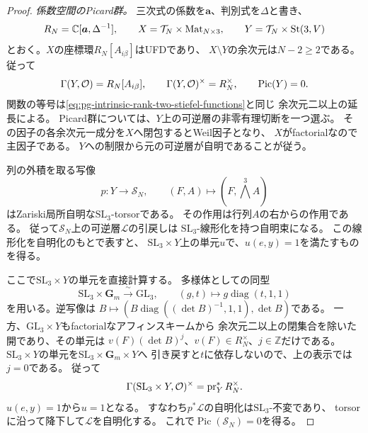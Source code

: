 \begin{proof}
\emph{係数空間のPicard群。}
三次式の係数を$\boldsymbol a$、判別式を$\Delta$と書き、
\begin{equation}
 R_N=\mathbb C[\boldsymbol a,\Delta^{-1}],\qquad
 X=\mathcal T_N\times\operatorname{Mat}_{N\times3},\qquad
 Y=\mathcal T_N\times\operatorname{St}(3,V)
 \label{eq:pg-intrinsic-gerbe-stiefel-cover}
\end{equation}
とおく。$X$の座標環$R_N[A_{i\beta}]$はUFDであり、
$X\setminus Y$の余次元は$N-2\ge2$である。
従って
\begin{equation}
 \Gamma(Y,\mathcal O)=R_N[A_{i\beta}],\qquad
 \Gamma(Y,\mathcal O)^\times=R_N^\times,\qquad
 \operatorname{Pic}(Y)=0.
 \label{eq:pg-intrinsic-gerbe-stiefel-picard}
\end{equation}
関数の等号は\eqref{eq:pg-intrinsic-rank-two-stiefel-functions}と同じ
余次元二以上の延長による。
Picard群については、$Y$上の可逆層の非零有理切断を一つ選ぶ。
その因子の各余次元一成分を$X$へ閉包するとWeil因子となり、
$X$がfactorialなので主因子である。
$Y$への制限から元の可逆層が自明であることが従う。

列の外積を取る写像
\begin{equation}
 p:Y\longrightarrow\mathcal S_N,\qquad
 (F,A)\longmapsto(F,\textstyle\bigwedge^3A)
 \label{eq:pg-intrinsic-gerbe-sl3-torsor}
\end{equation}
はZariski局所自明な$\mathrm{SL}_3$-torsorである。
その作用は行列$A$の右からの作用である。
従って$\mathcal S_N$上の可逆層$\mathcal L$の引戻しは
$\mathrm{SL}_3$-線形化を持つ自明束になる。
この線形化を自明化のもとで表すと、
$\mathrm{SL}_3\times Y$上の単元$u$で、$u(e,y)=1$を満たすものを得る。

ここで$\mathrm{SL}_3\times Y$の単元を直接計算する。
多様体としての同型
\begin{equation}
 \mathrm{SL}_3\times\mathbf G_m\xrightarrow{\ \sim\ }\mathrm{GL}_3,
 \qquad (g,t)\longmapsto g\operatorname{diag}(t,1,1)
 \label{eq:pg-intrinsic-gerbe-gl3-variety}
\end{equation}
を用いる。逆写像は
$B\mapsto(B\operatorname{diag}((\det B)^{-1},1,1),\det B)$である。
一方、$\mathrm{GL}_3\times Y$もfactorialなアフィンスキームから
余次元二以上の閉集合を除いた開であり、その単元は
$v(F)(\det B)^j$、$v(F)\in R_N^\times$、$j\in\mathbb Z$だけである。
$\mathrm{SL}_3\times Y$の単元を$\mathrm{SL}_3\times\mathbf G_m\times Y$へ
引き戻すと$t$に依存しないので、上の表示では$j=0$である。
従って
\begin{equation}
 \Gamma(\mathrm{SL}_3\times Y,\mathcal O)^\times
      =\operatorname{pr}_Y^*R_N^\times.
 \label{eq:pg-intrinsic-gerbe-sl3-units}
\end{equation}
$u(e,y)=1$から$u=1$となる。
すなわち$p^*\mathcal L$の自明化は$\mathrm{SL}_3$-不変であり、
torsorに沿って降下して$\mathcal L$を自明化する。
これで$\operatorname{Pic}(\mathcal S_N)=0$を得る。


\end{proof}
